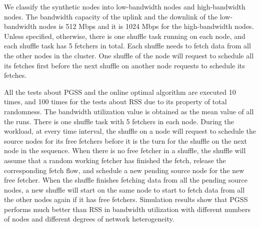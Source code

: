\documentclass[10pt,journal,compsoc]{IEEEtran}
\begin{document}
We classify the synthetic nodes into low-bandwidth nodes and
high-bandwidth nodes.
The bandwidth capacity of the uplink and the downlink of the
low-bandwidth nodes is 512 Mbps %
and it is 1024 Mbps for the high-bandwidth nodes. Unless specified, 
otherwise, there is one shuffle task running on each node, 
and each shuffle task has 5 fetchers in total. Each shuffle needs to fetch data from all the other nodes in the cluster.
One shuffle of the node will request to schedule all its fetches first 
before the next shuffle on another node requests to schedule its fetches. 

All the tests about PGSS and the online optimal algorithm are executed
10 times, and 100 times for
the tests about RSS due to its property of total randomness.
The bandwidth utilization value is obtained as the mean value of all the runs.
There is one shuffle task with 5 fetchers in each node.  
During the workload, at every time interval, 
the shuffle on a node will request to schedule the source nodes for
its free fetchers
before it is the turn for the shuffle on the next node in the sequence.
When there is no free fetcher in a shuffle, the shuffle will assume
that a random working fetcher has finished the
fetch, release the corresponding fetch flow, and schedule a new pending
source node for the new free fetcher.
When the shuffle finishes fetching data from all the pending source
nodes, a new shuffle will start on the same node to start to fetch
data from all the other nodes again if it has free fetchers.
Simulation results show that PGSS performs much better than RSS
in bandwidth utilization
with different numbers of nodes and different degrees of network heterogeneity. 
\end{document}
